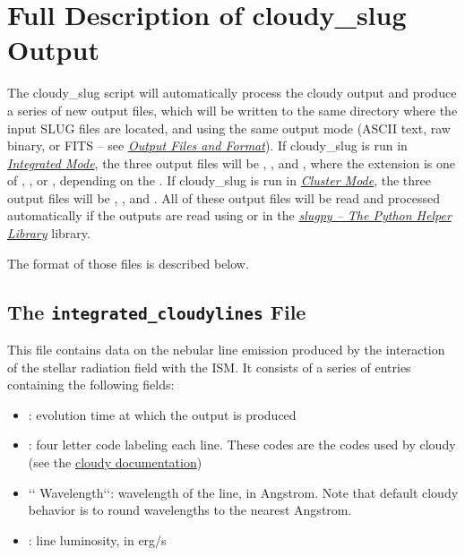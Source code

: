 \documentclass[letterpaper,10pt,english]{sphinxmanual}
\begin{document}
\section{Full Description of cloudy\_slug Output}
\label{cloudy:ssec-cloudy-output}\label{cloudy:full-description-of-cloudy-slug-output}
The cloudy\_slug script will automatically process the cloudy output
and produce a series of new output files, which will be written to the
same directory where the input SLUG files are located, and using the
same output mode (ASCII text, raw binary, or FITS -- see
{\hyperref[output:sec-output]{\emph{Output Files and Format}}}). If cloudy\_slug is run in
{\hyperref[cloudy:sssec-cloudy-integrated-mode]{\emph{Integrated Mode}}}, the three output files will be
,
, and
, where the extension 
is one of , , or , depending on the
. If cloudy\_slug is run in
{\hyperref[cloudy:sssec-cloudy-cluster-mode]{\emph{Cluster Mode}}}, the three output files will be
,
, and
. All of these output files will
be read and processed automatically if the outputs are read using
 or  in the {\hyperref[slugpy:sec-slugpy]{\emph{slugpy -- The Python Helper Library}}}
library.

The format of those files is described below.


\subsection{The \texttt{integrated\_cloudylines} File}
\label{cloudy:the-integrated-cloudylines-file}
This file contains data on the nebular line emission produced by the
interaction of the stellar radiation field with the ISM. It consists
of a series of entries containing the following fields:
\begin{itemize}
\item {} 
: evolution time at which the output is produced

\item {} 
: four letter code labeling each line. These codes
are the codes used by cloudy (see the \href{http://nublado.org}{cloudy documentation})

\item {} 
{}`{}` Wavelength{}`{}`: wavelength of the line, in Angstrom. Note that
default cloudy behavior is to round wavelengths to the nearest
Angstrom.

\item {} 
: line luminosity, in erg/s

\end{itemize}
\end{document}
